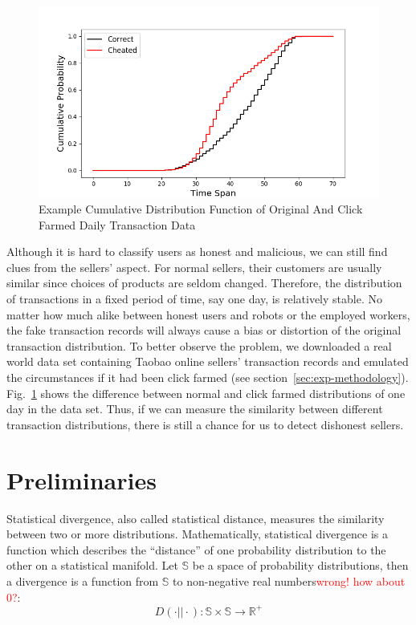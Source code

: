 \documentclass[10pt,conference,letterpaper]{IEEEtran}
\begin{document}
			\begin{figure}[ht]
				\centering
				\includegraphics[width=\linewidth]{fig/ExampleCDF.png}
				\caption{Example Cumulative Distribution Function of Original And Click Farmed Daily Transaction Data}
				\label{fig:example-ecdf}
			\end{figure}

			Although it is hard to classify users as honest and malicious, we can still find clues from the sellers' aspect. For normal sellers, their customers are usually similar since choices of products are seldom changed. Therefore, the distribution of transactions in a fixed period of time, say one day, is relatively stable. No matter how much alike between honest users and robots or the employed workers, the fake transaction records will always cause a bias or distortion of the original transaction distribution. To better observe the problem, we downloaded a real world data set containing Taobao online sellers' transaction records and emulated the circumstances if it had been click farmed (see section~\ref{sec:exp-methodology}). Fig.~\ref{fig:example-ecdf} shows the difference between normal and click farmed distributions of one day in the data set.
			Thus, if we can measure the similarity between different transaction distributions, there is still a chance for us to detect dishonest sellers.
	
	
	\section{Preliminaries}\label{sec:preliminaries}
		Statistical divergence, also called statistical distance, measures the similarity between two or more distributions.
		Mathematically, statistical divergence is a function which describes the ``distance'' of one probability distribution to the other on a statistical manifold. Let $\mathbb{S}$ be a space of probability distributions, then a divergence is a function from $\mathbb{S}$ to non-negative real numbers\textcolor{red}{wrong! how about 0?}: 
		\begin{equation}
			D(\cdot || \cdot): \mathbb{S} \times \mathbb{S} \rightarrow \mathbb{R^+}
		\end{equation}
	
\end{document}
